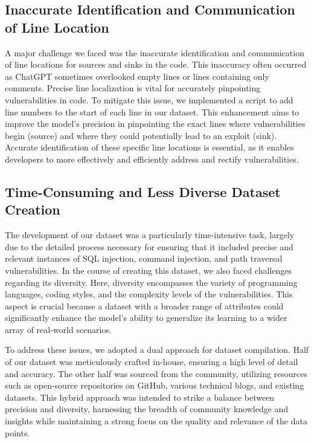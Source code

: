 \documentclass[acmsmall]{acmart}
\begin{document}
\subsection{Inaccurate Identification and Communication of Line Location}
A major challenge we faced was the inaccurate identification and communication of line locations for sources and sinks in the code. This inaccuracy often occurred as ChatGPT sometimes overlooked empty lines or lines containing only comments. Precise line localization is vital for accurately pinpointing vulnerabilities in code. To mitigate this issue, we implemented a script to add line numbers to the start of each line in our dataset. This enhancement aims to improve the model's precision in pinpointing the exact lines where vulnerabilities begin (source) and where they could potentially lead to an exploit (sink). Accurate identification of these specific line locations is essential, as it enables developers to more effectively and efficiently address and rectify vulnerabilities.

\subsection{Time-Consuming and Less Diverse Dataset Creation}
The development of our dataset was a particularly time-intensive task, largely due to the detailed process necessary for ensuring that it included precise and relevant instances of SQL injection, command injection, and path traversal vulnerabilities. In the course of creating this dataset, we also faced challenges regarding its diversity. Here, diversity encompasses the variety of programming languages, coding styles, and the complexity levels of the vulnerabilities. This aspect is crucial because a dataset with a broader range of attributes could significantly enhance the model's ability to generalize its learning to a wider array of real-world scenarios.

To address these issues, we adopted a dual approach for dataset compilation. Half of our dataset was meticulously crafted in-house, ensuring a high level of detail and accuracy. The other half was sourced from the community, utilizing resources such as open-source repositories on GitHub, various technical blogs, and existing datasets. This hybrid approach was intended to strike a balance between precision and diversity, harnessing the breadth of community knowledge and insights while maintaining a strong focus on the quality and relevance of the data points.
\end{document}
